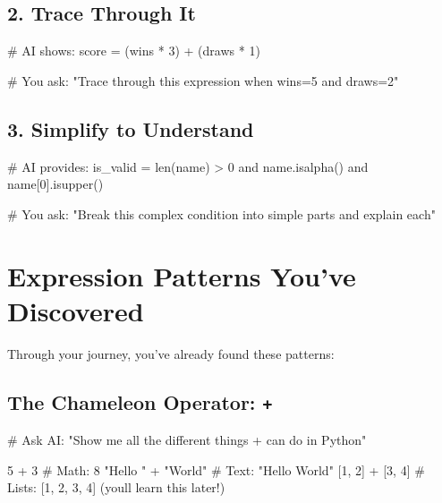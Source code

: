 \documentclass[
  letterpaper,
  DIV=11,
  numbers=noendperiod,
  oneside]{scrreprt}
\newenvironment{Shaded}{}{}
\newcommand{\BuiltInTok}[1]{\textcolor[rgb]{0.84,0.23,0.29}{#1}}
\newcommand{\CommentTok}[1]{\textcolor[rgb]{0.42,0.45,0.49}{#1}}
\newcommand{\DecValTok}[1]{\textcolor[rgb]{0.00,0.36,0.77}{#1}}
\newcommand{\KeywordTok}[1]{\textcolor[rgb]{0.84,0.23,0.29}{#1}}
\newcommand{\NormalTok}[1]{\textcolor[rgb]{0.14,0.16,0.18}{#1}}
\newcommand{\OperatorTok}[1]{\textcolor[rgb]{0.14,0.16,0.18}{#1}}
\newcommand{\StringTok}[1]{\textcolor[rgb]{0.01,0.18,0.38}{#1}}
\begin{document}
\subsection{2. Trace Through It}\label{trace-through-it}

\begin{Shaded}
\begin{Highlighting}[]
\CommentTok{\# AI shows:}
\NormalTok{score }\OperatorTok{=}\NormalTok{ (wins }\OperatorTok{*} \DecValTok{3}\NormalTok{) }\OperatorTok{+}\NormalTok{ (draws }\OperatorTok{*} \DecValTok{1}\NormalTok{)}

\CommentTok{\# You ask:}
\CommentTok{"Trace through this expression when wins=5 and draws=2"}
\end{Highlighting}
\end{Shaded}

\subsection{3. Simplify to Understand}\label{simplify-to-understand}

\begin{Shaded}
\begin{Highlighting}[]
\CommentTok{\# AI provides:}
\NormalTok{is\_valid }\OperatorTok{=} \BuiltInTok{len}\NormalTok{(name) }\OperatorTok{\textgreater{}} \DecValTok{0} \KeywordTok{and}\NormalTok{ name.isalpha() }\KeywordTok{and}\NormalTok{ name[}\DecValTok{0}\NormalTok{].isupper()}

\CommentTok{\# You ask:}
\CommentTok{"Break this complex condition into simple parts and explain each"}
\end{Highlighting}
\end{Shaded}

\section{Expression Patterns You've
Discovered}\label{expression-patterns-youve-discovered}

Through your journey, you've already found these patterns:

\subsection{\texorpdfstring{The Chameleon Operator:
\texttt{+}}{The Chameleon Operator: +}}\label{the-chameleon-operator}

\begin{Shaded}
\begin{Highlighting}[]
\CommentTok{\# Ask AI: "Show me all the different things + can do in Python"}

\DecValTok{5} \OperatorTok{+} \DecValTok{3}                    \CommentTok{\# Math: 8}
\CommentTok{"Hello "} \OperatorTok{+} \StringTok{"World"}       \CommentTok{\# Text: "Hello World"}
\NormalTok{[}\DecValTok{1}\NormalTok{, }\DecValTok{2}\NormalTok{] }\OperatorTok{+}\NormalTok{ [}\DecValTok{3}\NormalTok{, }\DecValTok{4}\NormalTok{]         }\CommentTok{\# Lists: [1, 2, 3, 4] (you\textquotesingle{}ll learn this later!)}
\end{Highlighting}
\end{Shaded}
\end{document}
